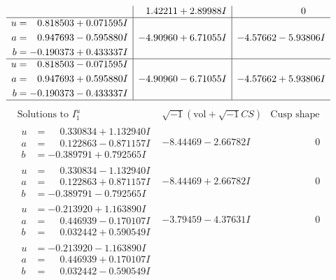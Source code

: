 \documentclass[1p]{elsarticle_modified}
\theoremstyle{definition}
\newcommand{\I}{\sqrt{-1}}
\begin{document}
$$\begin{array}{c|c|c}
 & \phantom{-}1.42211 + 2.89988 I & \phantom{-0.000000 } 0 \\ \hline\begin{aligned}
u &= \phantom{-}0.818503 + 0.071595 I \\
a &= \phantom{-}0.947693 - 0.595880 I \\
b &= -0.190373 + 0.433337 I\end{aligned}
 & -4.90960 + 6.71055 I & -4.57662 - 5.93806 I \\ \hline\begin{aligned}
u &= \phantom{-}0.818503 - 0.071595 I \\
a &= \phantom{-}0.947693 + 0.595880 I \\
b &= -0.190373 - 0.433337 I\end{aligned}
 & -4.90960 - 6.71055 I & -4.57662 + 5.93806 I\\
 \hline 
 \end{array}$$\newpage$$\begin{array}{c|c|c}  
\text{Solutions to }I^u_{1}& \I (\text{vol} + \sqrt{-1}CS) & \text{Cusp shape}\\
 \hline 
\begin{aligned}
u &= \phantom{-}0.330834 + 1.132940 I \\
a &= \phantom{-}0.122863 - 0.871157 I \\
b &= -0.389791 + 0.792565 I\end{aligned}
 & -8.44469 - 2.66782 I & \phantom{-0.000000 } 0 \\ \hline\begin{aligned}
u &= \phantom{-}0.330834 - 1.132940 I \\
a &= \phantom{-}0.122863 + 0.871157 I \\
b &= -0.389791 - 0.792565 I\end{aligned}
 & -8.44469 + 2.66782 I & \phantom{-0.000000 } 0 \\ \hline\begin{aligned}
u &= -0.213920 + 1.163890 I \\
a &= \phantom{-}0.446939 - 0.170107 I \\
b &= \phantom{-}0.032442 + 0.590549 I\end{aligned}
 & -3.79459 - 4.37631 I & \phantom{-0.000000 } 0 \\ \hline\begin{aligned}
u &= -0.213920 - 1.163890 I \\
a &= \phantom{-}0.446939 + 0.170107 I \\
b &= \phantom{-}0.032442 - 0.590549 I\end{aligned}

\end{array}$$
\end{document}
